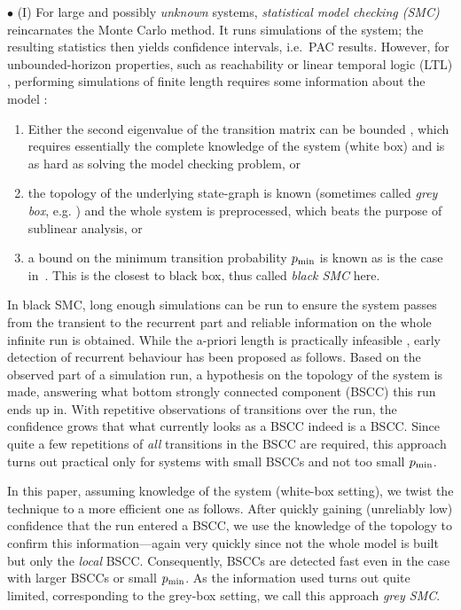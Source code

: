 $\bullet$ (I) For large and possibly \emph{unknown} systems, \emph{statistical model checking (SMC)} \cite{Younes02} reincarnates the Monte Carlo method.
It runs simulations of the system; the resulting statistics then yields confidence intervals, i.e.~PAC results. 
However, for unbounded-horizon properties, such as reachability or linear temporal logic (LTL) \cite{pnueli1977temporal}, performing simulations of finite length requires some information about the model \cite{isola-survey}:
\begin{enumerate}
	\item Either the second eigenvalue of the transition matrix can be bounded \cite{DBLP:journals/apal/LassaigneP08,YCZ10}, which requires essentially the complete knowledge of the system ({white box}) and is as hard as solving the model checking problem, or 
	\item the topology of the underlying state-graph is known \cite{YCZ10,ase10} (sometimes called \emph{grey box}, e.g. \cite{cav19})  and the whole system is preprocessed, which beats the purpose of sublinear analysis, or 
	\item a bound on the minimum transition probability $p_{\min}$ is known as is the case in~\cite{atva14,DHKPjournal}. This is the closest to black box, thus called \emph{black SMC} here.
\end{enumerate}


In black SMC, long enough simulations can be run to ensure the system passes from the transient to the recurrent part and reliable information on the whole infinite run is obtained.
While the a-priori length is practically infeasible \cite{atva14}, early detection of recurrent behaviour has been proposed \cite{DHKPjournal} as follows.
Based on the observed part of a simulation run, a hypothesis on the topology of the system is made, answering what bottom strongly connected component (BSCC) this run ends up in.
With repetitive observations of transitions over the run, the confidence grows that what currently looks as a BSCC indeed is a BSCC.
Since quite a few repetitions of \emph{all} transitions in the BSCC are required, this approach turns out practical only for systems with small BSCCs and not too small $p_{\min}$.



In this paper, assuming knowledge of the system (white-box setting), we twist the technique to a more efficient one as follows.
After quickly gaining (unreliably low) confidence that the run entered a BSCC, we use the knowledge of the topology to confirm this information---again very quickly since not the whole model is built but only the \emph{local} BSCC.
Consequently, BSCCs are detected fast even in the case with larger BSCCs or small $p_{\min}$.
As the information used turns out quite limited, corresponding to the grey-box setting, we call this approach \emph{grey SMC}.


